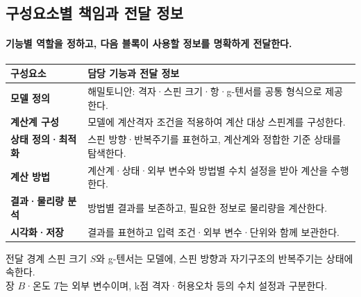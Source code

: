 \subsection{구성요소별 책임과 전달 정보}\label{boundaries}
\begingroup%
  \framesubtitle{기능별 역할을 정하고, 다음 블록이 사용할 정보를 명확하게 전달한다.}
  \begin{tabularx}{\textwidth}{@{}p{3.0cm}Y@{}}
    \toprule
    구성요소 & 담당 기능과 전달 정보 \\
    \midrule
    \textbf{모델 정의} & 해밀토니안: 격자·스핀 크기·항·g-텐서를 공통 형식으로 제공한다. \\
    \textbf{계산계 구성} & 모델에 계산격자 조건을 적용하여 계산 대상 스핀계를 구성한다. \\
    \textbf{상태 정의·최적화} & 스핀 방향·반복주기를 표현하고, 계산계와 정합한 기준 상태를 탐색한다. \\
    \textbf{계산 방법} & 계산계·상태·외부 변수와 방법별 수치 설정을 받아 계산을 수행한다. \\
    \textbf{결과·물리량 분석} & 방법별 결과를 보존하고, 필요한 정보로 물리량을 계산한다. \\
    \textbf{시각화·저장} & 결과를 표현하고 입력 조건·외부 변수·단위와 함께 보관한다. \\
    \bottomrule
  \end{tabularx}
  \par\medskip
  \begin{band}{전달 경계}
    스핀 크기 $S$와 g-텐서는 모델에, 스핀 방향과 자기구조의 반복주기는 상태에 속한다.\\
    장 $B$·온도 $T$는 외부 변수이며, k점 격자·허용오차 등의 수치 설정과 구분한다.
  \end{band}
\endgroup


